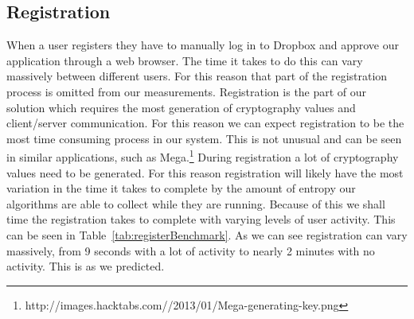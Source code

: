 \documentclass[12pt, titlepage]{article}
\begin{document}
\subsection{Registration}
When a user registers they have to manually log in to Dropbox and approve our application through a web browser. The time it takes to do this can vary massively between different users. For this reason that part of the registration process is omitted from our measurements. 
\newline \indent Registration is the part of our solution which requires the most generation of cryptography values and client/server communication. For this reason we can expect registration to be the most time consuming process in our system. This is not unusual and can be seen in similar applications, such as Mega.\footnote{http://images.hacktabs.com//2013/01/Mega-generating-key.png}
\newline \indent During registration a lot of cryptography values need to be generated. For this reason registration will likely have the most variation in the time it takes to complete by the amount of entropy our algorithms are able to collect while they are running. Because of this we shall time the registration takes to complete with varying levels of user activity. This can be seen in Table~\ref{tab:registerBenchmark}. As we can see registration can vary massively, from 9 seconds with a lot of activity to nearly 2 minutes with no activity. This is as we predicted.
\end{document}
